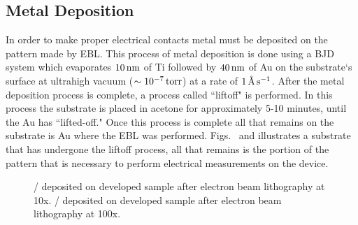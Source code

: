 \subsection{Metal Deposition}\label{subsec:deposition}
In order to make proper electrical contacts metal must be deposited on the pattern made by \acs{EBL}. This process of metal deposition is done using a \ac{BJD} system which evaporates $10\,\mathrm{nm}$ of \ac{Ti} followed by $40\,\mathrm{nm}$ of \acs{Au} on the substrate`s surface at ultrahigh vacuum ($\sim 10^{-7}\,\mathrm{torr}$) at a rate of $\SI{1}{\angstrom}\,\mathrm{s}^{-1}$. After the metal deposition process is complete, a process called ``liftoff" is performed. In this process the substrate is placed in acetone for approximately 5-10 minutes, until the \acs{Au} has ``lifted-off." Once this process is complete all that remains on the substrate is \acs{Au} where the \acs{EBL} was performed. Figs.~ and   illustrates a substrate that has undergone the liftoff process, all that remains is the portion of the pattern that is necessary to perform electrical measurements on the device. 
\begin{figure}[ht]
	\centering
	\qquad
	\caption[/ deposited on device]{\protect{} / deposited on developed sample after electron beam lithography at 10x. \protect{} / deposited on developed sample after electron beam lithography at 100x.}
	\label{fig:liftoff}
\end{figure}


